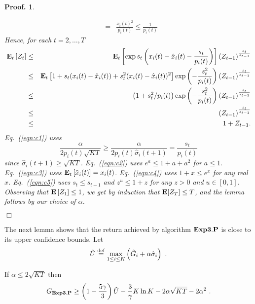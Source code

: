\documentclass[12pt]{article}
\newcommand{\E}{\mbox{\rm\bf E}}
\newcommand{\Aesthp}{{\bf Exp3.P}}
\newcommand{\paren}[1]{\left({#1}\right)}
\newcommand{\expb}[1]{\exp\left(#1\right)}
\newcommand{\defeq}{\stackrel{\rm def}{=}}
\newcommand{\Et}[1]{\mbox{\bf E$_t$}\left[#1\right]}
\newcommand{\x}[2]{x_{#1}({#2})}
\newcommand{\hsigma}[2]{\hat{\sigma}_{#1}({#2})}
\newcommand{\hU}{\hat{U}}
\newcommand{\p}[2]{p_{#1}(#2)}
\newcommand{\hx}[2]{\hat{x}_{#1}(#2)}
\newtheorem{pproof}{Proof.}
\newenvironment{proof}{
\begin{pproof}
        \begin{rm}\begin{rm}}{
        \hspace*{\fill} $\Box$
        \end{rm}\end{rm}
        \end{pproof}
}
\begin{document}
\begin{proof}
\begin{eqnarray}
&=& \frac{\x{i}{t}^2}{\p{i}{t}}
\le \frac{1}{\p{i}{t}}
\label{eqn:c0}
\end{eqnarray}
Hence, for each $t=2,\ldots,T$
\begin{eqnarray}
        \Et{Z_t}
&\leq& 
        \Et{\exp{s_t\paren{\x{i}{t}-\hx{i}{t} - \frac{s_t}{\p{i}{t}}}}}
         (Z_{t-1})^{\frac{s_t}{s_{t-1}}}
\label{eqn:c1}
\\ & \leq &
        \Et{1 + s_t(\x{i}{t}-\hx{i}{t}) + s_t^2 (\x{i}{t}-\hx{i}{t})^2}
         \expb{-\frac{s_t^2}{\p{i}{t}}}
         (Z_{t-1})^{\frac{s_t}{s_{t-1}}}
\label{eqn:c2}
\\ & \leq &
        \left(1 + s_t^2 / \p{i}{t}\right)
         \expb{-\frac{s_t^2}{\p{i}{t}}}
         (Z_{t-1})^{\frac{s_t}{s_{t-1}}}
\label{eqn:c3}
\\ & \leq &
        (Z_{t-1})^{\frac{s_t}{s_{t-1}}}
\label{eqn:c4}
\\ & \leq &
        1 + Z_{t-1}.
\label{eqn:c5}
\end{eqnarray}
Eq.~(\ref{eqn:c1}) uses
\[ \frac{\alpha}{2 \p{i}{t} \sqrt{K T}} \geq
  \frac{\alpha}{2 \p{i}{t} \hsigma{i}{t+1}} =
  \frac{s_t}{\p{i}{t}}
\]
since $\hsigma{i}{t+1} \geq \sqrt{K T}$.
Eq.~(\ref{eqn:c2}) uses
$e^a \leq 1 + a + a^2$ for $a \leq 1$.
Eq.~(\ref{eqn:c3}) uses
$\Et{\hx{i}{t}} = \x{i}{t}$.
Eq.~(\ref{eqn:c4}) uses $1+x\leq e^x$ for any real $x$.
Eq.~(\ref{eqn:c5}) uses $s_t \leq s_{t-1}$
and $z^u \leq 1+z$ for any $z>0$ and $u \in [0,1]$.
Observing that $\E\left[Z_1\right] \leq 1$,
we get by induction that $\E[Z_T] \leq T$, and the lemma follows by our choice
of $\alpha$.
\end{proof}
%
The next lemma shows that the return achieved by algorithm
$\Aesthp$ is close to its upper confidence bounds.
Let 
\[ \hU \defeq \max_{1 \leq i \leq K}
\left(\hat{G}_i+\alpha\hat{\sigma}_i\right)~. \] 
\begin{lemma}
\label{l:hedge.hp}
If $\alpha\leq 2\sqrt{KT}$ then 
\[ G_{\Aesthp} \geq 
     \left(1-\frac{5\gamma}{3}\right)\hU 
     -\frac{3}{\gamma}K\ln K 
     - 2 \alpha\sqrt{KT} 
     - 2 \alpha^2~. \]
\end{lemma}
\end{document}
